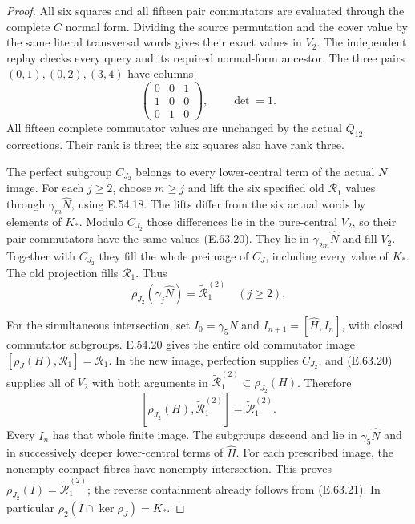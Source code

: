 \begin{proof}
All six squares and all fifteen pair commutators
are evaluated through the complete $C$ normal form.
Dividing the source permutation and the cover value
by the same literal transversal words gives their
exact values in $V_2$. The independent replay checks
every query and its required normal-form ancestor.
The three pairs $(0,1),(0,2),(3,4)$ have columns
\[
                  \begin{pmatrix}0&0&1\\1&0&0\\0&1&0\end{pmatrix},
                          \qquad\det=1.
 \tag{E.63.20}
\]
All fifteen complete commutator values are unchanged
by the actual $Q_{12}$ corrections. Their rank is
three; the six squares also have rank three.

The perfect subgroup $C_{J_2}$ belongs to every
lower-central term of the actual $N$ image.
For each $j\ge2$, choose $m\ge j$ and lift the six
specified old $\mathcal R_1$ values through
$\gamma_m\widehat N$, using E.54.18. The lifts
differ from the six actual words by elements of
$K_*$. Modulo $C_{J_2}$ those differences lie in
the pure-central $V_2$, so their pair commutators
have the same values \textup{(E.63.20)}.
They lie in $\gamma_{2m}\widehat N$ and fill $V_2$.
Together with $C_{J_2}$ they fill the whole preimage
of $C_J$, including every value of $K_*$. The old
projection fills $\mathcal R_1$. Thus
\[
       \rho_{J_2}(\gamma_j\widehat N)
                    =\widetilde{\mathcal R}_1^{(2)}
                             \quad(j\ge2).
 \tag{E.63.21}
\]

For the simultaneous intersection, set
$I_0=\gamma_5\widehat N$ and
$I_{n+1}=[\widehat H,I_n]$, with closed commutator
subgroups. E.54.20 gives the entire old commutator
image $[\rho_J(H),\mathcal R_1]=\mathcal R_1$.
In the new image, perfection supplies $C_{J_2}$,
and \textup{(E.63.20)} supplies all of $V_2$ with
both arguments in
$\widetilde{\mathcal R}_1^{(2)}\subset\rho_{J_2}(H)$.
Therefore
\[
 [\rho_{J_2}(H),\widetilde{\mathcal R}_1^{(2)}]
                         =\widetilde{\mathcal R}_1^{(2)}.
 \tag{E.63.22}
\]
Every $I_n$ has that whole finite image. The subgroups
descend and lie in $\gamma_5\widehat N$ and in
successively deeper lower-central terms of $\widehat H$.
For each prescribed image, the nonempty compact fibres
have nonempty intersection. This proves
$\rho_{J_2}(I)=\widetilde{\mathcal R}_1^{(2)}$;
the reverse containment already follows from
\textup{(E.63.21)}. In particular
$\rho_2(I\cap\ker\rho_J)=K_*$.


\end{proof}
